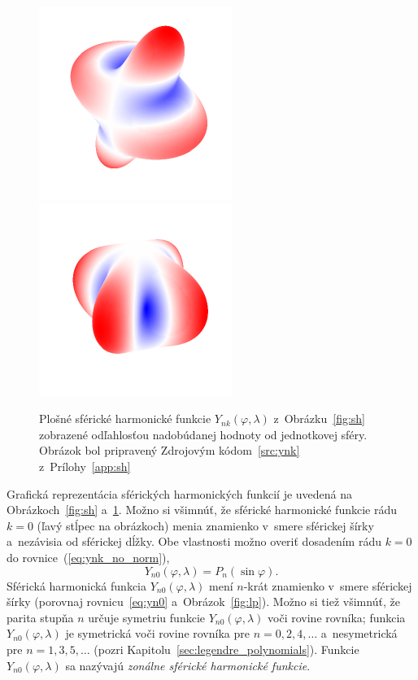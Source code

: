 \documentclass[a4paper, 12pt]{book}
\begin{document}
\begin{figure}[bt]
\includegraphics{./fig-spherical-harmonic-n4-k1-3d.pdf}
\includegraphics{./fig-spherical-harmonic-n4-k4-3d.pdf}
\caption{Plošné sférické harmonické funkcie $Y_{nk}(\varphi, \lambda)$
z~Obrázku~\ref{fig:sh} zobrazené odľahlosťou nadobúdanej hodnoty od jednotkovej
sféry.  Obrázok bol pripravený Zdrojovým kódom~\ref{src:ynk}
z~Prílohy~\ref{app:sh}}
\label{fig:sh3d}
\end{figure}

Grafická reprezentácia sférických harmonických funkcií je uvedená na
Obrázkoch~\ref{fig:sh} a~\ref{fig:sh3d}.  Možno si všimnúť, že sférické
harmonické funkcie rádu $k = 0$ (ľavý stĺpec na obrázkoch) menia znamienko
v~smere sférickej šírky a~nezávisia od sférickej dĺžky.  Obe vlastnosti možno
overiť dosadením rádu $k = 0$ do rovnice~(\ref{eq:ynk_no_norm}),
%
\begin{equation}
\label{eq:yn0}
Y_{n0}(\varphi, \lambda) = P_n(\sin\varphi){.}
\end{equation}
%
Sférická harmonická funkcia $Y_{n0}(\varphi, \lambda)$ mení $n$-krát znamienko
v~smere sférickej šírky (porovnaj rovnicu~\ref{eq:yn0} a~Obrázok~\ref{fig:lp}).
Možno si tiež všimnúť, že parita stupňa $n$ určuje symetriu funkcie
$Y_{n0}(\varphi, \lambda)$ voči rovine rovníka; funkcia $Y_{n0}(\varphi,
\lambda)$ je symetrická voči rovine rovníka pre $n = 0, 2, 4, \dots$
a~nesymetrická pre $n = 1, 3, 5, \dots$ (pozri
Kapitolu~\ref{sec:legendre_polynomials}). Funkcie $Y_{n0}(\varphi, \lambda)$ sa
nazývajú \emph{zonálne sférické harmonické funkcie}.
\end{document}
